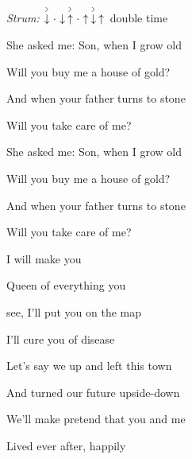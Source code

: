 \begin{song}


\begin{headerbox}
\RaiseBoxWithAccents
{} \quad
\textit{Strum:} $\AccentDown\Miss\Down\AccentUp\Miss\Up\AccentDown\Up$ double time
\end{headerbox}

\begin{vchordbox}
\end{vchordbox}

\LARGE


\bigskip

 \par
She asked me: Son, when I grow old \par
Will you buy me a house of gold? \par
And when your father turns to stone \par
Will you take care of me? \par

\bigskip

\begin{chorusbox}{\PrechorusAndChorus}
She asked me: Son, when I grow old \par
Will you buy me a house of gold? \par
And when your father turns to stone \par
Will you take care of me? \par

\bigskip

I will make you \par
{}Queen of everything you \par
{}see, I'll put you on the map \par
I'll cure you of disease  \par
\end{chorusbox}

\bigskip

Let's say we up and left this town \par
And turned our future upside-down \par
We'll make pretend that you and me \par
Lived ever after, happily \par
{} \par


\end{song}
